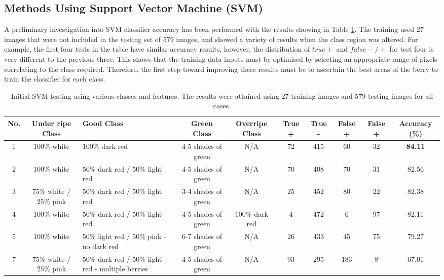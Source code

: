 \documentclass[fleqn,twoside,12pt]{report}
\begin{document}
\subsection{Methods Using Support Vector Machine (SVM)}

A preliminary investigation into SVM classifier accuracy has been performed with the results showing in Table \ref{tab:svm_results}. The training used 27 images that were not included in the testing set of 579 images, and showed a variety of results when the class region was altered. For example, the first four tests in the table have similar accuracy results, however, the distribution of $true +$ and $false -/+$ for test four is very different to the previous three. This shows that the training data inputs must be optimised by selecting an appropriate range of pixels correlating to the class required. Therefore, the first step toward improving these results must be to ascertain the best areas of the berry to train the classifier for each class. 


\begin{table} 
	\centering
	\footnotesize
	\caption{Initial SVM testing using various classes and features. The results were attained using 27 training images and 579 testing images for all cases.}
	\label{tab:svm_results}
	\begin{tabular}{ccp{2.5cm}ccccccc}
		\toprule
		\textbf{No.} & 		\textbf{Under ripe Class} & \textbf{Good Class} & \textbf{Green Class} & \textbf{Overripe Class} & \textbf{True +} & \textbf{True -} & \textbf{False +} & 		\textbf{False +} & 		\textbf{Accuracy (\%)} \tabularnewline
		\midrule
		
		 1 & 
		 $100\%$ white & 
		 $100\%$ dark red &
		 4-5 shades of green & N/A & 72 & 415 & 60 & 32 &   \textbf{84.11}\\
		\midrule

		 2 & 
		 $100\%$ white & 
		 $50\%$ dark red / $50\%$ light red &
		 4-5 shades of green & N/A & 70 & 408 & 70 & 31 & 82.56\\
		\midrule
				
		 3 & 
		 $75\%$ white / $25\%$ pink & 
		 $50\%$ dark red / $50\%$ light red &
		 3-4 shades of green &
		 N/A & 25 & 452 & 80 & 22 & 82.38\\
		 \midrule
		
		 4 & 
		 $100\%$ white & 
		 $50\%$ dark red / $50\%$ light red &
		 4-5 shades of green &
		 $100\%$ dark red & 4 & 472 & 6 & 97 & 82.11\\
		\midrule

		 5 & 
		 $100\%$ white & 
		 $50\%$ light red / $50\%$ pink - no dark red &
		 6-7 shades of green & N/A & 26 & 433 & 45 & 75 & 79.27\\
		\midrule

		 7 & 
		 $75\%$ white / $25\%$ pink & 
		 $50\%$ dark red / $50\%$ light red - multiple berries &
		 4-5 shades of green & N/A & 93 & 295 & 183 & 8 & 67.01\\
		\bottomrule
	\end{tabular}
\end{table} 
\end{document}
